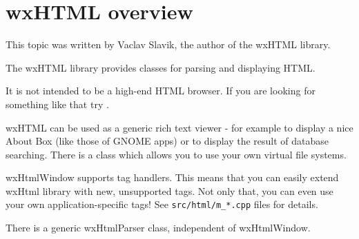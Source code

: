 \section{wxHTML overview}\label{wxhtml}

This topic was written by Vaclav Slavik, the author of the wxHTML library.

The wxHTML library provides classes for parsing and displaying HTML.

It is not intended to be a high-end HTML browser. If you are looking for
something like that try .

wxHTML can be used as a generic rich text viewer - for example to display 
a nice About Box (like those of GNOME apps) or to display the result of
database searching. There is a  
class which allows you to use your own virtual file systems.

wxHtmlWindow supports tag handlers. This means that you can easily
extend wxHtml library with new, unsupported tags. Not only that,
you can even use your own application-specific tags!
See {\tt src/html/m\_*.cpp} files for details.

There is a generic wxHtmlParser class,
independent of wxHtmlWindow.









